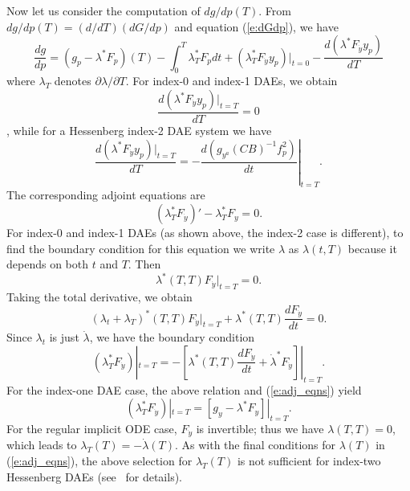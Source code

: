 Now let us consider the computation of ${dg}/{dp}(T)$.
From ${dg}/{dp}(T) = ({d}/{dT})({dG}/{dp})$ and equation (\ref{e:dGdp}), we have
\begin{equation}\label{e:dgdp1}
  \frac{dg}{dp} = (g_p - \lambda^*F_p)(T) - \int_0^T \lambda^*_TF_p dt + 
  (\lambda^*_T F_{\dot{y}}y_p)|_{t=0} - \frac{d(\lambda^*F_{\dot y}y_p)}{dT}
\end{equation}
where $\lambda_T$ denotes ${\partial \lambda}/{\partial T}$. 
For index-0 and index-1 DAEs, we obtain
$$
\frac{d(\lambda^*F_{\dot y}y_p)|_{t=T}}{dT} =0
$$,
while for a Hessenberg index-2 DAE system we have
$$
\frac{d(\lambda^*F_{\dot y}y_p)|_{t=T}}{dT} =
-\left.\frac{d(g_{y^a}(CB)^{-1}f^2_p)}{dt}\right|_{t=T} . 
$$
The corresponding adjoint equations are
\begin{equation} \label{e:adj1_eqns}
  (\lambda^*_TF_{\dot y})'  - \lambda^*_T F_y = 0.
\end{equation}
For index-0 and index-1 DAEs (as shown above, the index-2 case is 
different), to find the boundary condition for this equation we write
$\lambda$ as $\lambda(t, T)$ because it depends on both $t$ and $T$.  Then
$$
\lambda^*(T, T) F_{\dot{y}}|_{t=T}  = 0.
$$
Taking the total derivative, we obtain
$$
(\lambda_t + \lambda_T)^*(T, T) F_{\dot{y}}|_{t=T}  +
\lambda^*(T,T)\frac{dF_{\dot{y}}}{dt} = 0.
$$
Since $\lambda_t$ is just $\dot \lambda$, we have the boundary condition
\begin{equation*}
  (\lambda_T^* F_{\dot{y}} )|_{t=T}  = -
  \left[
    \lambda^*(T,T)\frac{dF_{\dot{y}}}{dt} +     
    \dot{\lambda}^* F_{\dot{y}} 
  \right] |_{t=T}.
\end{equation*}
For the index-one DAE case, the above relation and (\ref{e:adj_eqns}) yield
\begin{equation}
  (\lambda_T^* F_{\dot{y}} )|_{t=T} = \left[g_y - \lambda^*F_y\right]|_{t=T}.
\end{equation}
For the regular implicit ODE case, $F_{\dot{y}}$ is invertible; thus we have 
$\lambda(T, T) = 0$, which leads to $\lambda_T(T) = - \dot{\lambda}(T)$. 
As with the final conditions for $\lambda(T)$ in (\ref{e:adj_eqns}), the above selection
for $\lambda_T(T)$ is not sufficient for index-two Hessenberg DAEs (see~\cite{CLPS:03} for details).


